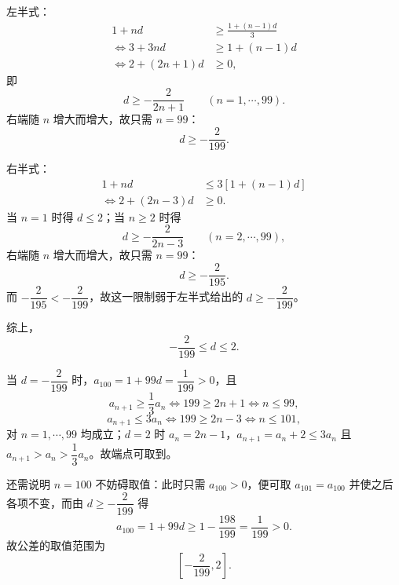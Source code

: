 \begin{answer}
左半式：
\nopagebreak[4]
\[\begin{aligned}
1+nd&\geqslant\frac{1+(n-1)d}3\\
\iff 3+3nd&\geqslant1+(n-1)d\\
\iff 2+(2n+1)d&\geqslant0,
\end{aligned}\]
即
\nopagebreak[4]
\[d\geqslant-\frac2{2n+1}\qquad(n=1,\cdots,99).\]
右端随 $n$ 增大而增大，故只需 $n=99$：
\nopagebreak[4]
\[d\geqslant-\frac2{199} .\]

右半式：
\nopagebreak[4]
\[\begin{aligned}
1+nd&\leqslant3\left[1+(n-1)d\right]\\
\iff 2+(2n-3)d&\geqslant0 .
\end{aligned}\]
当 $n=1$ 时得 $d\leqslant2$；当 $n\geqslant2$ 时得
\nopagebreak[4]
\[d\geqslant-\frac2{2n-3}\qquad(n=2,\cdots,99),\]
右端随 $n$ 增大而增大，故只需 $n=99$：
\nopagebreak[4]
\[d\geqslant-\frac2{195}.\]
而 $-\dfrac2{195}<-\dfrac2{199}$，故这一限制弱于左半式给出的 $d\geqslant-\dfrac2{199}$。

综上，
\nopagebreak[4]
\[-\frac2{199}\leqslant d\leqslant2 .\]

当 $d=-\dfrac2{199}$ 时，$a_{100}=1+99d=\dfrac1{199}>0$，且
\nopagebreak[4]
\[a_{n+1}\geqslant\frac13a_n\iff199\geqslant2n+1\iff n\leqslant99,\]
\nopagebreak[4]
\[a_{n+1}\leqslant3a_n\iff199\geqslant2n-3\iff n\leqslant101,\]
对 $n=1,\cdots,99$ 均成立；$d=2$ 时 $a_n=2n-1$，$a_{n+1}=a_n+2\leqslant3a_n$ 且 $a_{n+1}>a_n>\dfrac13a_n$。故端点可取到。

还需说明 $n=100$ 不妨碍取值：此时只需 $a_{100}>0$，便可取 $a_{101}=a_{100}$ 并使之后各项不变，而由 $d\geqslant-\dfrac2{199}$ 得
\nopagebreak[4]
\[a_{100}=1+99d\geqslant1-\frac{198}{199}=\frac1{199}>0 .\]
故公差的取值范围为
\nopagebreak[4]
\[\left[-\frac2{199},2\right].\]




\end{answer}